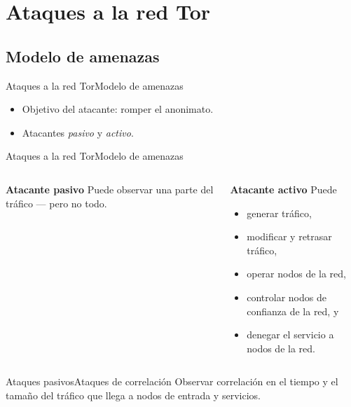 \documentclass[spanish]{beamer}
\begin{document}
\section{Ataques a la red Tor}

\subsection{Modelo de amenazas}

\begin{frame}{Ataques a la red Tor}{Modelo de amenazas}
  \begin{itemize}
  \item Objetivo del atacante: romper el anonimato.
  \item Atacantes \emph{pasivo} y \emph{activo}.
  \end{itemize}
\end{frame}

\begin{frame}{Ataques a la red Tor}{Modelo de amenazas}
  \begin{columns}[t]
    
    \begin{block}{\textbf{Atacante pasivo}}
      Puede observar una parte del tráfico --- pero no todo.
    \end{block}
    
    
    \begin{block}{\textbf{Atacante activo}}
      Puede
      \begin{itemize}
      \item generar tráfico,
      \item modificar y retrasar tráfico,
      \item operar nodos de la red,
      \item controlar nodos de confianza de la red, y
      \item denegar el servicio a nodos de la red.
      \end{itemize}
    \end{block}
  \end{columns}
\end{frame}

\begin{frame}{Ataques pasivos}{Ataques de correlación} 
  Observar correlación en el tiempo y el tamaño del tráfico que llega a nodos de entrada
  y servicios.
\end{frame}
\end{document}
